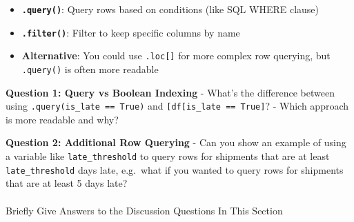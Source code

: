 \documentclass[
  letterpaper,
  DIV=11,
  numbers=noendperiod]{scrartcl}
\makeatletter
\let\oldparagraph\paragraph
\renewcommand{\paragraph}{
    \@ifstar
      \xxxParagraphStar
      \xxxParagraphNoStar
  }
\newcommand{\xxxParagraphStar}[1]{\oldparagraph*{#1}\mbox{}}
\newcommand{\xxxParagraphNoStar}[1]{\oldparagraph{#1}\mbox{}}
\providecommand{\tightlist}{%
  \setlength{\itemsep}{0pt}\setlength{\parskip}{0pt}}
\makeatother
\begin{document}
\begin{tcolorbox}[enhanced jigsaw, bottomtitle=1mm, opacitybacktitle=0.6, toptitle=1mm, colbacktitle=quarto-callout-note-color!10!white, breakable, coltitle=black, bottomrule=.15mm, left=2mm, colframe=quarto-callout-note-color-frame, colback=white, title=\textcolor{quarto-callout-note-color}{\faInfo}\hspace{0.5em}{🔍 Understanding the Methods}, leftrule=.75mm, arc=.35mm, rightrule=.15mm, opacityback=0, toprule=.15mm, titlerule=0mm]

\begin{itemize}
\tightlist
\item
  \textbf{\texttt{.query()}}: Query rows based on conditions (like SQL
  WHERE clause)
\item
  \textbf{\texttt{.filter()}}: Filter to keep specific columns by name
\item
  \textbf{Alternative}: You could use \texttt{.loc{[}{]}} for more
  complex row querying, but \texttt{.query()} is often more readable
\end{itemize}

\end{tcolorbox}

\begin{tcolorbox}[enhanced jigsaw, bottomtitle=1mm, opacitybacktitle=0.6, toptitle=1mm, colbacktitle=quarto-callout-important-color!10!white, breakable, coltitle=black, bottomrule=.15mm, left=2mm, colframe=quarto-callout-important-color-frame, colback=white, title=\textcolor{quarto-callout-important-color}{\faExclamation}\hspace{0.5em}{🤔 Discussion Questions: Subset Mental Model}, leftrule=.75mm, arc=.35mm, rightrule=.15mm, opacityback=0, toprule=.15mm, titlerule=0mm]

\textbf{Question 1: Query vs Boolean Indexing} - What's the difference
between using
\texttt{.query(\textquotesingle{}is\_late\ ==\ True\textquotesingle{})}
and
\texttt{{[}df{[}\textquotesingle{}is\_late\textquotesingle{}{]}\ ==\ True{]}}?
- Which approach is more readable and why?

\textbf{Question 2: Additional Row Querying} - Can you show an example
of using a variable like \texttt{late\_threshold} to query rows for
shipments that are at least \texttt{late\_threshold} days late,
e.g.~what if you wanted to query rows for shipments that are at least 5
days late?

\end{tcolorbox}

\paragraph{Briefly Give Answers to the Discussion Questions In This
Section}\label{briefly-give-answers-to-the-discussion-questions-in-this-section-1}
\end{document}
